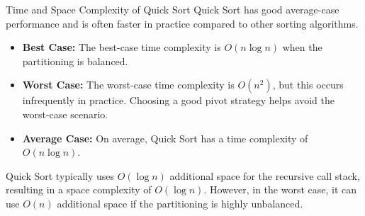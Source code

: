 \begin{frame}{Time and Space Complexity of Quick Sort}
    Quick Sort has good average-case performance and is often faster in practice compared to other sorting algorithms.

    \begin{itemize}
        \item \textbf{Best Case:} The best-case time complexity is $O(n \log n)$ when the partitioning is balanced.
        
        \item \textbf{Worst Case:} The worst-case time complexity is $O(n^2)$, but this occurs infrequently in practice. Choosing a good pivot strategy helps avoid the worst-case scenario.
        
        \item \textbf{Average Case:} On average, Quick Sort has a time complexity of $O(n \log n)$.
        \cite{1}\cite{6}\cite{7}
    \end{itemize}

    Quick Sort typically uses $O(\log n)$ additional space for the recursive call stack, resulting in a space complexity of $O(\log n)$. However, in the worst case, it can use $O(n)$ additional space if the partitioning is highly unbalanced.
\end{frame}

